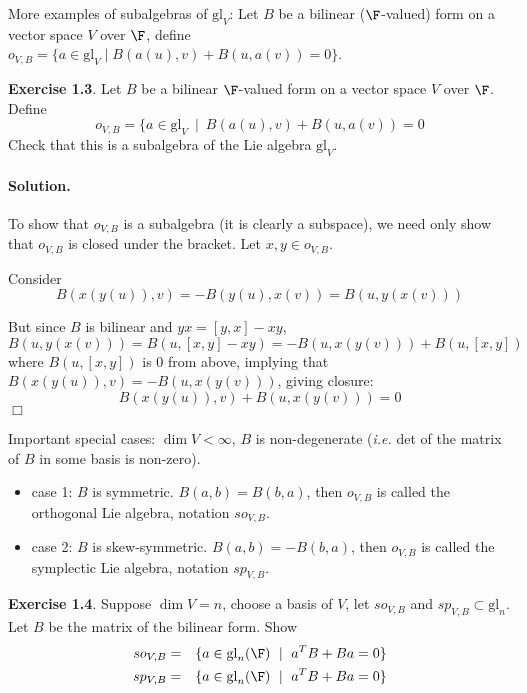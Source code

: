 \documentclass[11pt]{article}
\newcommand{\gl}{\mbox{gl}}
\newcommand{\sk}{\vspace*{1em}}
\begin{document}
More examples of subalgebras of $\gl_V$: Let $B$ be a bilinear ($\F$-valued)
form on a vector space $V$ over $\F$, define $o_{V,B} = \{ a \in \gl_V \mid
B(a(u), v) + B(u, a(v)) = 0 \}$.

\sk\noindent
{\bf Exercise 1.3}. Let $B$ be a bilinear $\F$-valued form on a vector space
$V$ over $\F$.  Define
\[ o_{V,B} = \{a \in \gl_V \ \mid \ B(a(u), v) + B(u, a(v)) = 0 \]
Check that this is a subalgebra of the Lie algebra $\gl_V$.

\paragraph{Solution.} To show that $o_{V,B}$ is a subalgebra (it is clearly a subspace), 
we need only show that
$o_{V,B}$ is closed under the bracket.  Let $x, y \in o_{V,B}$.

Consider
\[ B(x(y(u)), v) = -B(y(u), x(v)) = B(u, y(x(v))) \]

But since $B$ is bilinear and $yx = [y,x]-xy$, $B(u, y(x(v))) = B(u,
[x, y] - xy) = -B(u, x(y(v))) + B(u, [x, y])$ where $B(u, [x, y])$ is
0 from above, implying that $B(x(y(u)), v) = -B(u, x(y(v)))$, giving
closure:
\[ B(x(y(u)), v) + B(u, x(y(v))) = 0 \]
$\Box$

Important special cases: $\dim V < \infty$, $B$ is non-degenerate
(\emph{i.e.} det of the matrix of $B$ in some basis is non-zero).
\begin{itemize}
\item case 1: $B$ is symmetric.  $B(a,b) = B(b,a)$, then $o_{V,B}$ 
is called the orthogonal Lie algebra, notation $so_{V,B}$.
\item case 2: $B$ is skew-symmetric.  $B(a,b) = -B(b,a)$, then $o_{V,B}$ 
is called the symplectic Lie algebra, notation $sp_{V,B}$.
\end{itemize}

\sk\noindent
{\bf Exercise 1.4}. Suppose $\dim V = n$, choose a basis of $V$, let
$so_{V, B}$ and $sp_{V, B} \subset \gl_n$.  Let $B$
be the matrix of the bilinear form.  Show
\begin{eqnarray*}
so_{V,B} &=& \{ a \in \gl_n(\F) \ \mid \ a^T B + Ba = 0 \}\\
sp_{V,B} &=& \{ a \in \gl_n(\F) \ \mid \ a^T B + Ba = 0 \}
\end{eqnarray*}
\end{document}
